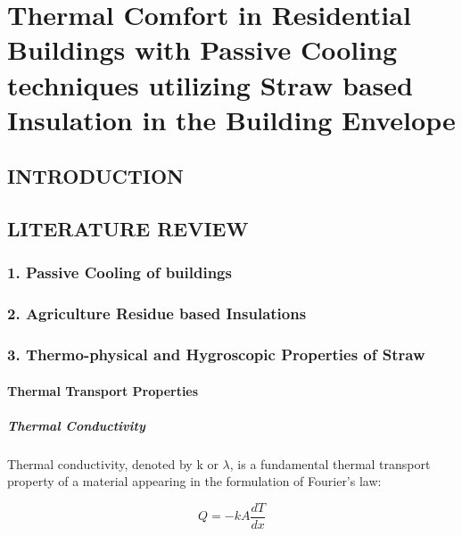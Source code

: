 \documentclass[]{article}
\date{}
\let\oldparagraph\paragraph
\renewcommand{\paragraph}[1]{\oldparagraph{#1}\mbox{}}
\let\oldsubparagraph\subparagraph
\renewcommand{\subparagraph}[1]{\oldsubparagraph{#1}\mbox{}}
\begin{document}
\hypertarget{header-n0}{%
\section{Thermal Comfort in Residential Buildings with Passive Cooling
techniques utilizing Straw based Insulation in the Building
Envelope}\label{header-n0}}

\hypertarget{header-n2}{%
\subsection{INTRODUCTION}\label{header-n2}}

\hypertarget{header-n3}{%
\subsection{LITERATURE REVIEW}\label{header-n3}}

\hypertarget{header-n4}{%
\subsubsection{1. Passive Cooling of buildings}\label{header-n4}}

\hypertarget{header-n5}{%
\subsubsection{2. Agriculture Residue based
Insulations}\label{header-n5}}

\hypertarget{header-n6}{%
\subsubsection{3. Thermo-physical and Hygroscopic Properties of
Straw}\label{header-n6}}

\hypertarget{header-n7}{%
\paragraph{Thermal Transport Properties}\label{header-n7}}

\hypertarget{header-n8}{%
\subparagraph{Thermal Conductivity}\label{header-n8}}

 Thermal conductivity, denoted by k or \(\lambda\), is a fundamental
thermal transport property of a material appearing in the formulation of
Fourier's law:

\[Q = - kA\frac{dT}{dx}\]
\end{document}
